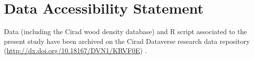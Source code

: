 \documentclass[a4paper, 12pt, leqno, dvipsnames]{article}\usepackage[]{graphicx}\usepackage[]{color}
\begin{document}
\section*{Data Accessibility Statement}

Data (including the Cirad wood density database) and R script associated to the present study have been archived on the Cirad Dataverse research data repository (\url{http://dx.doi.org/10.18167/DVN1/KRVF0E}) \citep{Vieilledent2017-CWDD}.


\newpage
\singlespacing

\renewcommand\refname{Literature Cited}
%
%
\end{document}
